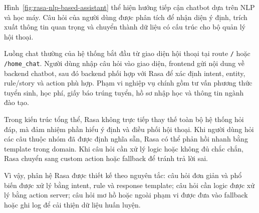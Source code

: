 Hình~\ref{fig:rasa-nlp-based-assistant} thể hiện hướng tiếp cận chatbot dựa trên NLP và học máy. Câu hỏi của người dùng được phân tích để nhận diện ý định, trích xuất thông tin quan trọng và chuyển thành dữ liệu có cấu trúc cho bộ quản lý hội thoại.

Luồng chat thường của hệ thống bắt đầu từ giao diện hội thoại tại route \texttt{/} hoặc \texttt{/home\_chat}. Người dùng nhập câu hỏi vào giao diện, frontend gửi nội dung về backend chatbot, sau đó backend phối hợp với Rasa để xác định intent, entity, rule/story và action phù hợp. Phạm vi nghiệp vụ chính gồm tư vấn phương thức tuyển sinh, học phí, giấy báo trúng tuyển, hồ sơ nhập học và thông tin ngành đào tạo.

Trong kiến trúc tổng thể, Rasa không trực tiếp thay thế toàn bộ hệ thống hỏi đáp, mà đảm nhiệm phần hiểu ý định và điều phối hội thoại. Khi người dùng hỏi các câu thuộc nhóm đã được định nghĩa sẵn, Rasa có thể phản hồi nhanh bằng template trong domain. Khi câu hỏi cần xử lý logic hoặc không đủ chắc chắn, Rasa chuyển sang custom action hoặc fallback để tránh trả lời sai.

Vì vậy, phân hệ Rasa được thiết kế theo nguyên tắc: câu hỏi đơn giản và phổ biến được xử lý bằng intent, rule và response template; câu hỏi cần logic được xử lý bằng action server; câu hỏi mơ hồ hoặc ngoài phạm vi được đưa vào fallback hoặc ghi log để cải thiện dữ liệu huấn luyện.

